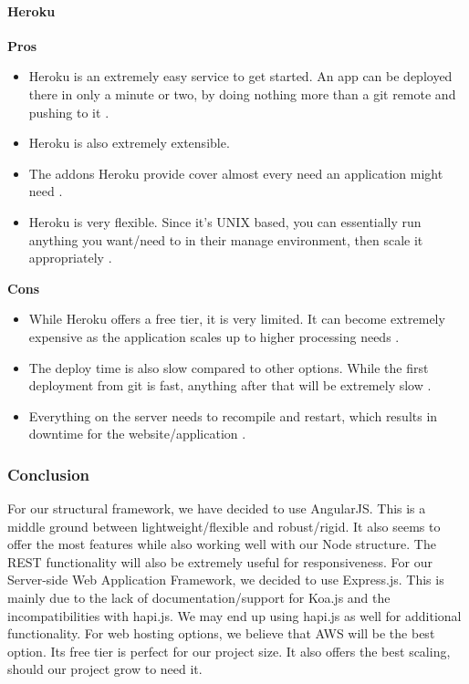 	\paragraph{Heroku}	
		\textbf{Pros} 
			\begin{itemize}
				\item Heroku is an extremely easy service to get started. An app can be deployed there in only a minute or two, by doing nothing more than a git remote and pushing to it \cite{heroku}. 
				\item Heroku is also extremely extensible.
				\item The addons Heroku provide cover almost every need an application might need \cite{heroku}. 
				\item Heroku is very flexible. Since it's UNIX based, you can essentially run anything you want/need to in their manage environment, then scale it appropriately \cite{heroku}.
			\end{itemize}
		\textbf{Cons}
			\begin{itemize}
				\item While Heroku offers a free tier, it is very limited. It can become extremely expensive as the application scales up to higher processing needs \cite{heroku}. 
				\item The deploy time is also slow compared to other options. While the first deployment from git is fast, anything after that will be extremely slow \cite{heroku}. 
				\item Everything on the server needs to recompile and restart, which results in downtime for the website/application \cite{heroku}.
			\end{itemize}
			
			
\subsubsection{Conclusion}

For our structural framework, we have decided to use AngularJS. This is a middle ground between lightweight/flexible and robust/rigid. It also seems to offer the most features while also working well with our Node structure. The REST functionality will also be extremely useful for responsiveness. For our Server-side Web Application Framework, we decided to use Express.js. This is mainly due to the lack of documentation/support for Koa.js and the incompatibilities with hapi.js. We may end up using hapi.js as well for additional functionality. For web hosting options, we believe that AWS will be the best option. Its free tier is perfect for our project size. It also offers the best scaling, should our project grow to need it.



